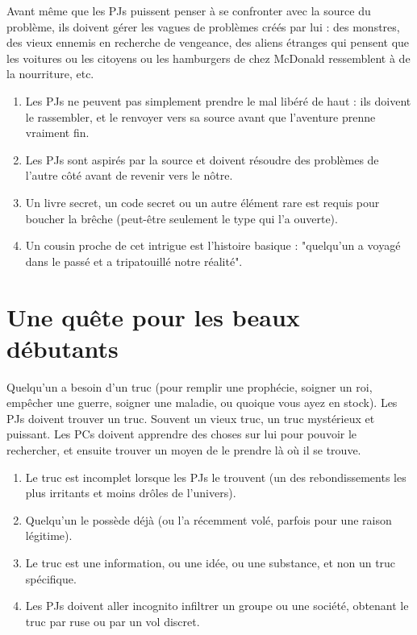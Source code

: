 \begin{multicols}{2}
Avant même que les PJs puissent penser à se confronter avec la source du problème, ils doivent gérer les vagues de problèmes créés par lui : des monstres, des vieux ennemis en recherche de vengeance, des aliens étranges qui pensent que les voitures ou les citoyens ou les hamburgers de chez McDonald ressemblent à de la nourriture, etc.

\themes
\begin{enumerate}
\item Les PJs ne peuvent pas simplement prendre le mal libéré de haut : ils doivent le rassembler, et le renvoyer vers sa source avant que l'aventure prenne vraiment fin.
\item Les PJs sont aspirés par la source et doivent résoudre des problèmes de l'autre côté avant de revenir vers le nôtre.
\item Un livre secret, un code secret ou un autre élément rare est requis pour boucher la brêche (peut-être seulement le type qui l'a ouverte).
\item Un cousin proche de cet intrigue est l'histoire basique : "quelqu'un a voyagé dans le passé et a tripatouillé notre réalité".
\end{enumerate}

\section{Une quête pour les beaux débutants}
\label{debutant}


Quelqu'un a besoin d'un truc (pour remplir une prophécie, soigner un roi, empêcher une guerre, soigner une maladie, ou quoique vous ayez en stock). Les PJs doivent trouver un truc. Souvent un vieux truc, un truc mystérieux et puissant. Les PCs doivent apprendre des choses sur lui pour pouvoir le rechercher, et ensuite trouver un moyen de le prendre là où il se trouve.

\themes
\begin{enumerate}
\item Le truc est incomplet lorsque les PJs le trouvent (un des rebondissements les plus irritants et moins drôles de l'univers).
\item Quelqu'un le possède déjà (ou l'a récemment volé, parfois pour une raison légitime).
\item Le truc est une information, ou une idée, ou une substance, et non un truc spécifique.
\item Les PJs doivent aller incognito infiltrer un groupe ou une société, obtenant le truc par ruse ou par un vol discret.
\end{enumerate}


\end{multicols}
